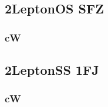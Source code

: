 \documentclass[landscape, 12pt,letterpaper]{article}
\begin{document}
\newpage

\newpage

\subsection{2LeptonOS SFZ}
\subsubsection{cW}


\newpage

\newpage

\subsection{2LeptonSS 1FJ}
\subsubsection{cW}


\newpage

\newpage
\end{document}
